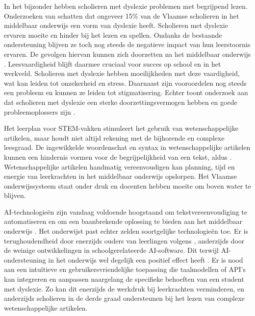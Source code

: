 In het bijzonder hebben scholieren met dyslexie problemen met begrijpend lezen. Onderzoeken van \textcite{Bonte2020, VanDerMeer2022} schatten dat ongeveer 15\% van de Vlaamse scholieren in het middelbaar onderwijs een vorm van dyslexie heeft. Scholieren met dyslexie ervaren moeite en hinder bij het lezen en spellen. Ondanks de bestaande ondersteuning blijven ze toch nog steeds de negatieve impact van hun leerstoornis ervaren. De gevolgen hiervan  kunnen zich doorzetten na het middelbaar onderwijs \autocite{Lissens2020}. Leesvaardigheid blijft daarmee cruciaal voor succes op school en in het werkveld. Scholieren met dyslexie hebben moeilijkheden met deze vaardigheid, wat kan leiden tot onzekerheid en stress. Daarnaast zijn vooroordelen nog steeds een probleem en kunnen ze leiden tot stigmatisering. Echter toont onderzoek aan dat scholieren met dyslexie een sterke doorzettingsvermogen hebben en goede probleemoplossers zijn \autocite{Ghesquiere2018, Lissens2020, Bonte2020}. 

\medspace

Het leerplan voor STEM-vakken stimuleert het gebruik van wetenschappelijke artikelen, maar houdt niet altijd rekening met de bijhorende en complexe leesgraad. De ingewikkelde woordenschat en syntax in wetenschappelijke artikelen kunnen een hindernis vormen voor de begrijpelijkheid van een tekst, aldus \textcite{PlavenSigray2017}. Wetenschappelijke artikelen handmatig vereenvoudigen kan planning, tijd en energie van leerkrachten in het middelbaar onderwijs opslorpen. Het Vlaamse onderwijssysteem staat onder druk en docenten hebben moeite om boven water te blijven. 

\medspace

AI-technologieën zijn vandaag voldoende hoogstaand om tekstvereenvoudiging te automatiseren en om een baanbrekende oplossing te bieden aan het middelbaar onderwijs \autocite{Belpaeme2018}. Het onderwijst past echter zelden soortgelijke technologieën toe. Er is terughoudendheid door enerzijds ouders van leerlingen volgens \textcite{Martens2021a}, anderzijds door de weinige ontwikkelingen in schoolgerelateerde AI-software. Dit terwijl AI-ondersteuning in het onderwijs wel degelijk een positief effect heeft \autocite{Kraft2020}. Er is nood aan een intuïtieve en gebruikersvriendelijke toepassing die taalmodellen of API's kan integreren en aanpassen naargelang de specifieke behoeften van een student met dyslexie. Zo kan dit enerzijds de werkdruk bij leerkrachten verminderen, en anderzijds scholieren in de derde graad ondersteunen bij het lezen van complexe wetenschappelijke artikelen.

